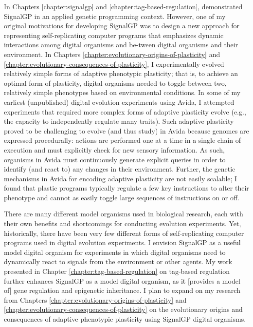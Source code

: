In Chapters \ref{chapter:signalgp} and \ref{chapter:tag-based-regulation}, demonstrated SignalGP in an applied genetic programming context. 
However, one of my original motivations for developing SignalGP was to design a new approach for representing self-replicating computer programs that emphasizes dynamic interactions among digital organisms and be-tween digital organisms and their environment.
In Chapters \ref{chapter:evolutionary-origins-of-plasticity} and \ref{chapter:evolutionary-consequences-of-plasticity}, I experimentally evolved relatively simple forms of adaptive phenotypic plasticity; that is, to achieve an optimal form of plasticity, digital organisms needed to toggle between two, relatively simple phenotypes based on environmental conditions. 
In some of my earliest (unpublished) digital evolution experiments using Avida, I attempted experiments that required more complex forms of adaptive plasticity evolve (e.g., the capacity to independently regulate many traits). 
Such adaptive plasticity proved to be challenging to evolve (and thus study) in Avida because genomes are expressed procedurally: actions are performed one at a time in a single chain of execution and must explicitly check for new sensory information.
As such, organisms in Avida must continuously generate explicit queries in order to identify (and react to) any changes in their environment.
Further, the genetic mechanisms in Avida for encoding adaptive plasticity are not easily scalable; I found that plastic programs typically regulate a few key instructions to alter their phenotype and cannot as easily toggle large sequences of instructions on or off.

There are many different model organisms used in biological research, each with their own benefits and shortcomings for conducting evolution experiments. 
Yet, historically, there have been very few different forms of self-replicating computer programs used in digital evolution experiments. 
I envision SignalGP as a useful model digital organism for experiments in which digital organisms need to dynamically react to signals from the environment or other agents. 
My work presented in Chapter \ref{chapter:tag-based-regulation} on tag-based regulation further enhances SignalGP as a model digital organism, as it [provides a model of] gene regulation and epigenetic inheritance.   
I plan to expand on my research from Chapters \ref{chapter:evolutionary-origins-of-plasticity} and \ref{chapter:evolutionary-consequences-of-plasticity} on the evolutionary origins and consequences of adaptive phenotypic plasticity using SignalGP digital organisms. 

